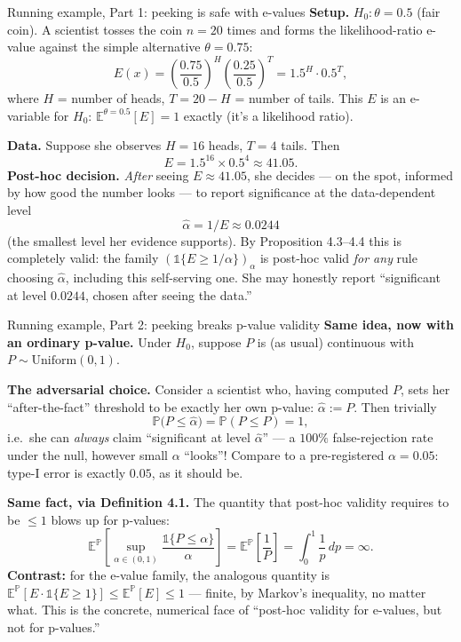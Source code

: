 \documentclass[aspectratio=169,10pt]{beamer}
\begin{document}
\begin{frame}{Running example, Part 1: peeking is safe with e-values}
  \textbf{Setup.} $H_0:\theta=0.5$ (fair coin). A scientist tosses the coin
  $n=20$ times and forms the likelihood-ratio e-value against the simple
  alternative $\theta=0.75$:
  \[
    E(x) = \left(\frac{0.75}{0.5}\right)^{H}\left(\frac{0.25}{0.5}\right)^{T} = 1.5^{H}\cdot 0.5^{T},
  \]
  where $H$ = number of heads, $T=20-H$ = number of tails. This $E$ is an
  e-variable for $H_0$: $\mathbb E^{\theta=0.5}[E] = 1$ exactly (it's a
  likelihood ratio).

  \medskip
  \textbf{Data.} Suppose she observes $H=16$ heads, $T=4$ tails. Then
  \[
    E = 1.5^{16}\times 0.5^{4} \approx 41.05.
  \]
  \textbf{Post-hoc decision.} \emph{After} seeing $E\approx 41.05$, she
  decides --- on the spot, informed by how good the number looks --- to
  report significance at the data-dependent level
  \[
    \hat\alpha = 1/E \approx 0.0244
  \]
  (the smallest level her evidence supports). By Proposition 4.3--4.4 this is
  completely valid: the family $(\mathbb 1\{E\ge1/\alpha\})_\alpha$ is
  post-hoc valid \emph{for any} rule choosing $\hat\alpha$, including this
  self-serving one. She may honestly report ``significant at level $0.0244$,
  chosen after seeing the data.''
\end{frame}

\begin{frame}{Running example, Part 2: peeking breaks p-value validity}
  \textbf{Same idea, now with an ordinary p-value.} Under $H_0$, suppose $P$
  is (as usual) continuous with $P\sim\text{Uniform}(0,1)$.

  \medskip
  \textbf{The adversarial choice.} Consider a scientist who, having computed
  $P$, sets her ``after-the-fact'' threshold to be exactly her own p-value:
  $\hat\alpha := P$. Then trivially
  \[
    \mathbb P\big(P \le \hat\alpha\big) = \mathbb P(P\le P) = 1,
  \]
  i.e.\ she can \emph{always} claim ``significant at level $\hat\alpha$'' ---
  a $100\%$ false-rejection rate under the null, however small $\alpha$
  ``looks''! Compare to a pre-registered $\alpha=0.05$: type-I error is
  exactly $0.05$, as it should be.

  \medskip
  \textbf{Same fact, via Definition 4.1.} The quantity that post-hoc validity
  requires to be $\le 1$ blows up for p-values:
  \[
    \mathbb E^{\mathbb P}\!\left[\sup_{\alpha\in(0,1)}\frac{\mathbb 1\{P\le\alpha\}}{\alpha}\right]
     = \mathbb E^{\mathbb P}\!\left[\frac1P\right]
     = \int_0^1 \frac1p\,dp = \infty.
  \]
  \textbf{Contrast:} for the e-value family, the analogous quantity is
  $\mathbb E^{\mathbb P}[E\cdot\mathbb 1\{E\ge1\}]\le\mathbb E^{\mathbb P}[E]\le 1$ ---
  finite, by Markov's inequality, no matter what. This is the concrete,
  numerical face of ``post-hoc validity for e-values, but not for p-values.''
\end{frame}
\end{document}
